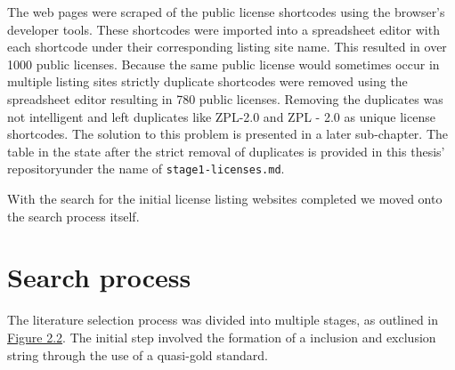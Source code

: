 The web pages were scraped of the public license shortcodes using the browser's developer tools. These shortcodes were imported into a spreadsheet editor with each shortcode under their corresponding listing site name. This resulted in over 1000 public licenses. Because the same public license would sometimes occur in multiple listing sites strictly duplicate shortcodes were removed using the spreadsheet editor resulting in 780 public licenses. Removing the duplicates was not intelligent and left duplicates like ZPL-2.0 and ZPL - 2.0 as unique license shortcodes. The solution to this problem is presented in a later sub-chapter. The table in the state after the strict removal of duplicates is provided in this thesis' repository\footnotemark[1] under the name of \texttt{stage1-licenses.md}.

With the search for the initial license listing websites completed we moved onto the search process itself.

\section{Search process}
The literature selection process was divided into multiple stages, as outlined in \hyperref[fig:search-process]{Figure 2.2}. The initial step involved the formation of a inclusion and exclusion string through the use of a quasi-gold standard.

